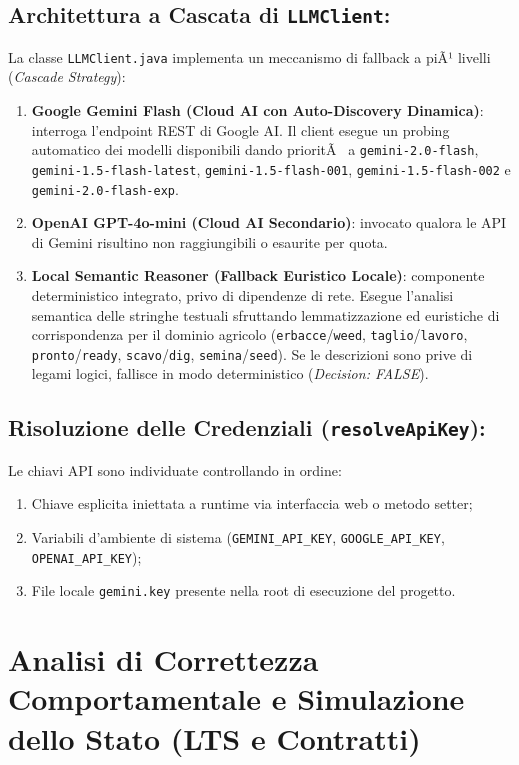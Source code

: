 ﻿\documentclass[11pt, a4paper]{report}
\begin{document}
\subsection{Architettura a Cascata di \texttt{LLMClient}:}
La classe \texttt{LLMClient.java} implementa un meccanismo di fallback a piÃ¹ livelli (\textit{Cascade Strategy}):
\begin{enumerate}
    \item \textbf{Google Gemini Flash (Cloud AI con Auto-Discovery Dinamica)}: interroga l'endpoint REST di Google AI. Il client esegue un probing automatico dei modelli disponibili dando prioritÃ  a \texttt{gemini-2.0-flash}, \texttt{gemini-1.5-flash-latest}, \texttt{gemini-1.5-flash-001}, \texttt{gemini-1.5-flash-002} e \texttt{gemini-2.0-flash-exp}.
    \item \textbf{OpenAI GPT-4o-mini (Cloud AI Secondario)}: invocato qualora le API di Gemini risultino non raggiungibili o esaurite per quota.
    \item \textbf{Local Semantic Reasoner (Fallback Euristico Locale)}: componente deterministico integrato, privo di dipendenze di rete. Esegue l'analisi semantica delle stringhe testuali sfruttando lemmatizzazione ed euristiche di corrispondenza per il dominio agricolo (\texttt{erbacce}/\texttt{weed}, \texttt{taglio}/\texttt{lavoro}, \texttt{pronto}/\texttt{ready}, \texttt{scavo}/\texttt{dig}, \texttt{semina}/\texttt{seed}). Se le descrizioni sono prive di legami logici, fallisce in modo deterministico (\textit{Decision: FALSE}).
\end{enumerate}

\subsection{Risoluzione delle Credenziali (\texttt{resolveApiKey}):}
Le chiavi API sono individuate controllando in ordine:
\begin{enumerate}
    \item Chiave esplicita iniettata a runtime via interfaccia web o metodo setter;
    \item Variabili d'ambiente di sistema (\texttt{GEMINI\_API\_KEY}, \texttt{GOOGLE\_API\_KEY}, \texttt{OPENAI\_API\_KEY});
    \item File locale \texttt{gemini.key} presente nella root di esecuzione del progetto.
\end{enumerate}

\section{Analisi di Correttezza Comportamentale e Simulazione dello Stato (LTS e Contratti)}
\end{document}
